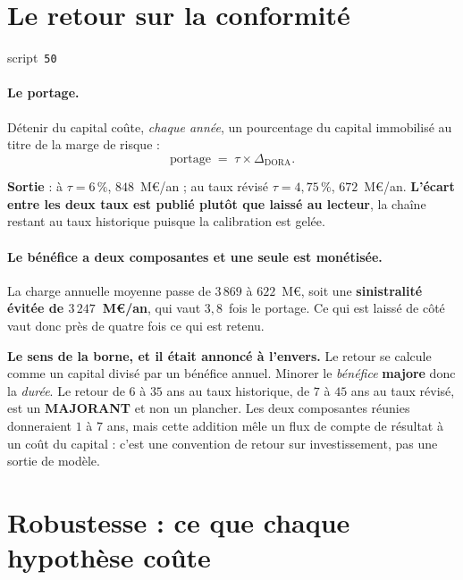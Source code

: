 \documentclass[11pt,a4paper]{article}
\newcommand{\src}[1]{\hfill{\footnotesize\textsf{script~\texttt{#1}}}}
\begin{document}
\section{Le retour sur la conformité}
\src{\texttt{50}}

\paragraph{Le portage.} Détenir du capital coûte, \emph{chaque année}, un pourcentage du capital
immobilisé au titre de la marge de risque :
\begin{equation}
\text{portage} \;=\; \tau \times \Delta_{\text{DORA}}.
\end{equation}

\begin{res}
\textbf{Sortie} : à $\tau = 6\,\%$, $848$~M\euro/an ; au taux révisé $\tau = 4{,}75\,\%$,
$672$~M\euro/an. \textbf{L'écart entre les deux taux est publié plutôt que laissé au lecteur},
la chaîne restant au taux historique puisque la calibration est gelée.
\end{res}

\paragraph{Le bénéfice a deux composantes et une seule est monétisée.} La charge annuelle moyenne
passe de $3\,869$ à $622$~M\euro, soit une \textbf{sinistralité évitée de $3\,247$~M\euro/an},
qui vaut $3{,}8$~fois le portage. Ce qui est laissé de côté vaut donc près de quatre fois ce qui
est retenu.

\begin{cle}
\textbf{Le sens de la borne, et il était annoncé à l'envers.} Le retour se calcule comme un
capital divisé par un bénéfice annuel. Minorer le \emph{bénéfice} \textbf{majore} donc la
\emph{durée}. Le retour de $6$ à $35$ ans au taux historique, de $7$ à $45$ ans au taux révisé,
est un \textbf{MAJORANT} et non un plancher. Les deux composantes réunies donneraient $1$ à
$7$ ans, mais cette addition mêle un flux de compte de résultat à un coût du capital : c'est une
convention de retour sur investissement, pas une sortie de modèle.
\end{cle}

\section{Robustesse : ce que chaque hypothèse coûte}
\end{document}
